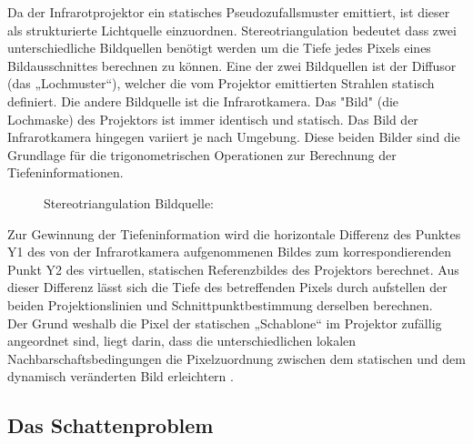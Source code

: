 Da der Infrarotprojektor ein statisches Pseudozufallsmuster emittiert, ist dieser als strukturierte Lichtquelle einzuordnen.
Stereotriangulation bedeutet dass zwei unterschiedliche Bildquellen benötigt werden um die Tiefe jedes Pixels eines Bildausschnittes berechnen zu können.
Eine der zwei Bildquellen ist der Diffusor (das „Lochmuster“), welcher die vom Projektor emittierten Strahlen statisch definiert. Die andere Bildquelle ist die Infrarotkamera.
Das "Bild" (die Lochmaske) des Projektors ist immer identisch und statisch. Das Bild der Infrarotkamera hingegen variiert je nach Umgebung. Diese beiden Bilder sind die Grundlage für die trigonometrischen Operationen zur Berechnung der Tiefeninformationen.

\begin{figure}[!ht]
  \centering
   \caption{ Stereotriangulation Bildquelle:\cite{stereotriangluation}}
\end{figure}
Zur Gewinnung der Tiefeninformation wird die horizontale Differenz des Punktes Y1 des von der Infrarotkamera aufgenommenen Bildes zum korrespondierenden Punkt Y2 des virtuellen, statischen Referenzbildes des Projektors berechnet. Aus dieser Differenz lässt sich die Tiefe des betreffenden Pixels durch aufstellen der beiden Projektionslinien und Schnittpunktbestimmung derselben berechnen. \\
Der Grund weshalb die Pixel der statischen „Schablone“ im Projektor zufällig angeordnet sind, liegt darin, dass die unterschiedlichen lokalen Nachbarschaftsbedingungen die Pixelzuordnung zwischen dem statischen und dem dynamisch veränderten Bild erleichtern \cite{primesense}.


\subsection{Das Schattenproblem}


